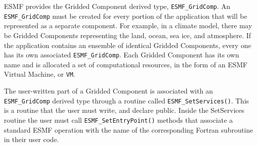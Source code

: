 ESMF provides the Gridded Component derived type, 
{\tt ESMF\_GridComp}.  An {\tt ESMF\_GridComp} must be created 
for every portion of the application that will be represented 
as a separate component.  For example, in a climate model, there may 
be Gridded Components representing the land, ocean, sea ice, and 
atmosphere.  If the application contains an ensemble of identical 
Gridded Components, every one has its own associated {\tt ESMF\_GridComp}.
Each Gridded Component has its own name and is allocated
a set of computational resources, in the form of an ESMF Virtual
Machine, or {\tt VM}.

The user-written part of a Gridded Component is associated with an
{\tt ESMF\_GridComp} derived type through a routine called 
{\tt ESMF\_SetServices()}.
This is a routine that the user must write, and declare public.
Inside the SetServices routine the user must call  
{\tt ESMF\_SetEntryPoint()} methods that associate a standard ESMF 
operation with the name of the corresponding Fortran subroutine 
in their user code.
